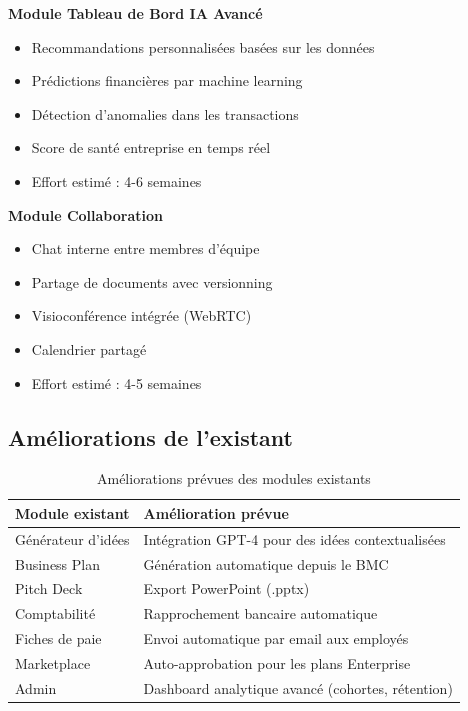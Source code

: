 \textbf{Module Tableau de Bord IA Avancé}
\begin{itemize}
    \item Recommandations personnalisées basées sur les données
    \item Prédictions financières par machine learning
    \item Détection d'anomalies dans les transactions
    \item Score de santé entreprise en temps réel
    \item Effort estimé : 4-6 semaines
\end{itemize}

\textbf{Module Collaboration}
\begin{itemize}
    \item Chat interne entre membres d'équipe
    \item Partage de documents avec versionning
    \item Visioconférence intégrée (WebRTC)
    \item Calendrier partagé
    \item Effort estimé : 4-5 semaines
\end{itemize}

\subsection{Améliorations de l'existant}

\begin{table}[H]
\centering
\caption{Améliorations prévues des modules existants}
\label{tab:existing-improvements}
\begin{tabular}{|l|l|}
\hline
\textbf{Module existant} & \textbf{Amélioration prévue} \\
\hline
Générateur d'idées & Intégration GPT-4 pour des idées contextualisées \\
\hline
Business Plan & Génération automatique depuis le BMC \\
\hline
Pitch Deck & Export PowerPoint (.pptx) \\
\hline
Comptabilité & Rapprochement bancaire automatique \\
\hline
Fiches de paie & Envoi automatique par email aux employés \\
\hline
Marketplace & Auto-approbation pour les plans Enterprise \\
\hline
Admin & Dashboard analytique avancé (cohortes, rétention) \\
\hline
\end{tabular}
\end{table}

